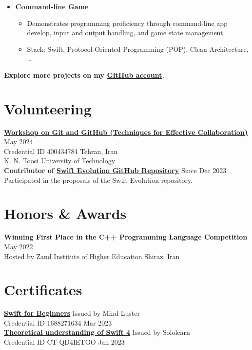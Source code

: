 \documentclass[letter,12pt]{article}
\newcommand{\customsquare}{\raisebox{0.25ex}{\scalebox{0.45}{$\blacksquare$}}}
\begin{document}
\begin{itemize}[label={\customsquare}]
    \item \href{https://github.com/nsswifter/CommandLineGame}{\underline{\textbf{Command-line Game}}}
    \begin{itemize}
        \item Demonstrates programming proficiency through command-line app develop, input and output handling, and game state management.
        \item Stack: Swift, Protocol-Oriented Programming (POP), Clean Architecture, …
    \end{itemize}
\end{itemize}

\small \textbf{Explore more projects on my \href{https://github.com/nsswifter}{\underline{GitHub account}}.}

\section*{Volunteering}
\href{https://github.com/nsswifter/CV/blob/main/Assets/certificate-of-workshop-participation-karami-mehdi.pdf}{\underline{\textbf{Workshop on Git and GitHub (Techniques for Effective Collaboration)}}} \hfill May 2024 \\ [5pt]
Credential ID 400434784 \hfill Tehran, Iran \\ [5pt]
K. N. Toosi University of Technology \\ [15pt]
\textbf{Contributor of \href{https://github.com/swiftlang/swift-evolution}{\underline{\textbf{Swift Evolution GitHub Repository}}}} \hfill Since Dec 2023 \\ [5pt]
Participated in the proposals of the Swift Evolution repository.

\pagebreak

\section*{Honors \& Awards}
\noindent
\textbf{Winning First Place in the C++ Programming Language Competition} \hfill May 2022 \\ [5pt]
Hosted by Zand Institute of Higher Education \hfill Shiraz, Iran

\vspace{5mm} %

\section*{Certificates}
\noindent
\href{https://www.mindluster.com/storage/cer/1688271634.jpg}{\underline{\textbf{Swift for Beginners}}} \hfill Issued by Mind Luster \\ [5pt]
Credential ID 1688271634 \hfill Mar 2023 \\ [15pt]
\href{https://www.sololearn.com/certificate/CT-QD4IETGO/png}{\underline{\textbf{Theoretical understanding of Swift 4}}} \hfill Issued by Sololearn \\ [5pt]
Credential ID CT-QD4IETGO \hfill Jan 2023
\end{document}
